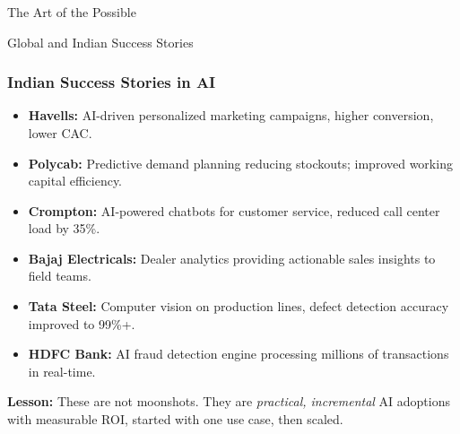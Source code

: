\begin{frame}[fragile]\frametitle{}
\begin{center}
{\Large The Art of the Possible}

{\small Global and Indian Success Stories}
\end{center}
\end{frame}

\begin{frame}[fragile]\frametitle{Indian Success Stories in AI}

\begin{itemize}
  \item \textbf{Havells:} AI-driven personalized marketing campaigns, higher conversion, lower CAC.
  \item \textbf{Polycab:} Predictive demand planning reducing stockouts; improved working capital efficiency.
  \item \textbf{Crompton:} AI-powered chatbots for customer service, reduced call center load by 35\%.
  \item \textbf{Bajaj Electricals:} Dealer analytics providing actionable sales insights to field teams.
  \item \textbf{Tata Steel:} Computer vision on production lines, defect detection accuracy improved to 99\%+.
  \item \textbf{HDFC Bank:} AI fraud detection engine processing millions of transactions in real-time.
\end{itemize}

\textbf{Lesson:} These are not moonshots. They are \textit{practical, incremental} AI adoptions with measurable ROI, started with one use case, then scaled.

\end{frame}


